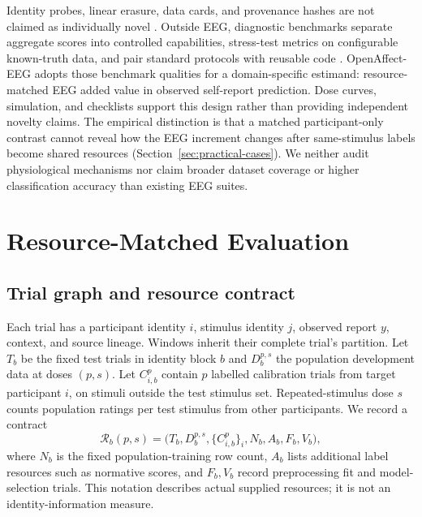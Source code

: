 \documentclass{article}
\begin{document}
Identity probes, linear erasure, data cards, and provenance hashes are not
claimed as individually novel
\citep{lin2026identitytrap,gebru2021datasheets,mitchell2019modelcards,akhtar2024croissant}.
Outside EEG, diagnostic benchmarks separate aggregate scores into controlled
capabilities, stress-test metrics on configurable known-truth data, and pair
standard protocols with reusable code
\citep{radevski2025dave,tan2025syntsbench,ma2024imdlbenco,reuel2024betterbench}.
OpenAffect-EEG adopts those benchmark qualities for a domain-specific estimand:
resource-matched EEG added value in observed self-report prediction. Dose
curves, simulation, and checklists support this design rather than providing
independent novelty claims. The empirical distinction is that a matched
participant-only contrast cannot reveal how the EEG increment changes after
same-stimulus labels become shared resources (Section~\ref{sec:practical-cases}). We neither audit physiological mechanisms nor claim broader
dataset coverage or higher classification accuracy than existing EEG suites.



\section{Resource-Matched Evaluation}
\subsection{Trial graph and resource contract}
Each trial has a participant identity $i$, stimulus identity $j$, observed
report $y$, context, and source lineage. Windows inherit their complete trial's
partition. Let $T_b$ be the fixed test trials in identity block $b$ and
$D_b^{p,s}$ the population development data at doses $(p,s)$. Let $C_{i,b}^p$
contain $p$ labelled calibration trials from target participant $i$, on stimuli
outside the test stimulus set. Repeated-stimulus dose $s$ counts population
ratings per test stimulus from other participants. We record a contract
\begin{equation}
\mathcal R_b(p,s)=
\bigl(T_b,D_b^{p,s},\{C_{i,b}^p\}_i,N_b,A_b,F_b,V_b\bigr),
\end{equation}
where $N_b$ is the fixed population-training row count, $A_b$ lists additional
label resources such as normative scores, and $F_b,V_b$ record preprocessing
fit and model-selection trials. This notation describes actual supplied
resources; it is not an identity-information measure.
\end{document}
